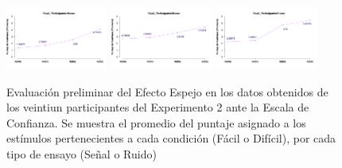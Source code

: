 \documentclass[a4paper ]{article}
\begin{document}
\begin{figure}[th]
\includegraphics[width=0.3\textwidth]{Figures/MirrorRating_Exp2_P19} \includegraphics[width=0.3\textwidth]{Figures/MirrorRating_Exp2_P20} \includegraphics[width=0.3\textwidth]{Figures/MirrorRating_Exp2_P21} 
\caption[Puntaje de confianza promedio por tipo de estímulo (A-B) y tipo de ensayo (S-N); Experimento 2]{Evaluación preliminar del Efecto Espejo en los datos obtenidos de los veintiun participantes del Experimento 2 ante la Escala de Confianza. Se muestra el promedio del puntaje asignado a los estímulos pertenecientes a cada condición (Fácil o Difícil), por cada tipo de ensayo (Señal o Ruido)}
\label{fig:MERating_E2}
\end{figure}
\end{document}
